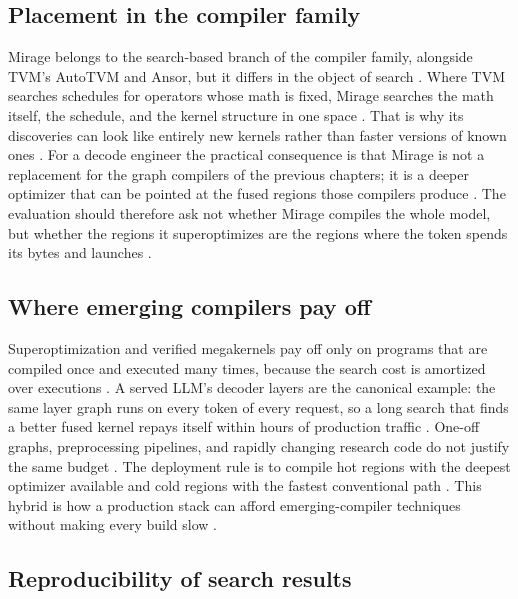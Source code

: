 \subsection{Placement in the compiler family}

Mirage belongs to the search-based branch of the compiler family, alongside TVM's AutoTVM and Ansor, but it differs in the object of search \citep{wu2024mirage,chen2018autotvm,zheng2020ansor}. Where TVM searches schedules for operators whose math is fixed, Mirage searches the math itself, the schedule, and the kernel structure in one space \citep{wu2024mirage,chen2018tvm}. That is why its discoveries can look like entirely new kernels rather than faster versions of known ones \citep{wu2024mirage,patel2025llminference}. For a decode engineer the practical consequence is that Mirage is not a replacement for the graph compilers of the previous chapters; it is a deeper optimizer that can be pointed at the fused regions those compilers produce \citep{iree2024,taxbreak2026}. The evaluation should therefore ask not whether Mirage compiles the whole model, but whether the regions it superoptimizes are the regions where the token spends its bytes and launches \citep{memoryfloor2026,patel2025llminference}.

\subsection{Where emerging compilers pay off}

Superoptimization and verified megakernels pay off only on programs that are compiled once and executed many times, because the search cost is amortized over executions \citep{wu2024mirage,kwon2023vllm}. A served LLM's decoder layers are the canonical example: the same layer graph runs on every token of every request, so a long search that finds a better fused kernel repays itself within hours of production traffic \citep{taxbreak2026,memoryfloor2026}. One-off graphs, preprocessing pipelines, and rapidly changing research code do not justify the same budget \citep{wu2024mirage,chen2020compilerbasedhardw}. The deployment rule is to compile hot regions with the deepest optimizer available and cold regions with the fastest conventional path \citep{patel2025llminference,taxbreak2026}. This hybrid is how a production stack can afford emerging-compiler techniques without making every build slow \citep{wu2024mirage,memoryfloor2026}.

\subsection{Reproducibility of search results}

